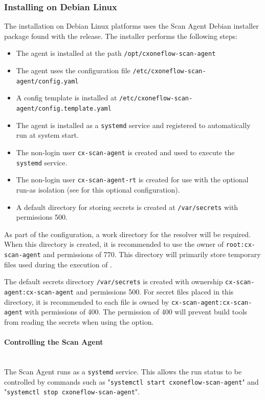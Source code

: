\subsubsection{Installing on Debian Linux}

The installation on Debian Linux platforms uses the Scan Agent Debian installer package
found with the \cxoneflow release.  The installer performs the following steps:

\begin{itemize}
  \item The agent is installed at the path \texttt{/opt/cxoneflow-scan-agent}
  \item The agent uses the configuration file \texttt{/etc/cxoneflow-scan-agent/config.yaml}
  \item A config template is installed at \texttt{/etc/cxoneflow-scan-agent/config.template.yaml}
  \item The agent is installed as a \texttt{systemd} service and registered to automatically run at system start.
  \item The non-login user \texttt{cx-scan-agent} is created and used to execute the \texttt{systemd} service.
  \item The non-login user \texttt{cx-scan-agent-rt} is created for use with the optional run-as isolation
    (see  for this optional configuration).
  \item A default directory for storing secrets is created at \texttt{/var/secrets} with permissions 500.
\end{itemize}

As part of the configuration, a work directory for the resolver will be required.  When this directory
is created, it is recommended to use the owner of \texttt{root:cx-scan-agent} and permissions of 770.  This
directory will primarily store temporary files used during the execution of \scaresolver.

The default secrets directory \texttt{/var/secrets} is created with ownership \texttt{cx-scan-agent:cx-scan-agent} and
permissions 500.  For secret files placed in this directory, it is recommended to each file is owned
by \texttt{cx-scan-agent:cx-scan-agent} with permissions of 400.  The permission of 400 will prevent 
build tools from reading the secrets when using the  option.

\paragraph{Controlling the Scan Agent}
\noindent\\The Scan Agent runs as a \texttt{systemd} service.  This allows the run status to be controlled
by commands such as "\texttt{systemctl start cxoneflow-scan-agent}" and\\"\texttt{systemctl stop cxoneflow-scan-agent}".

